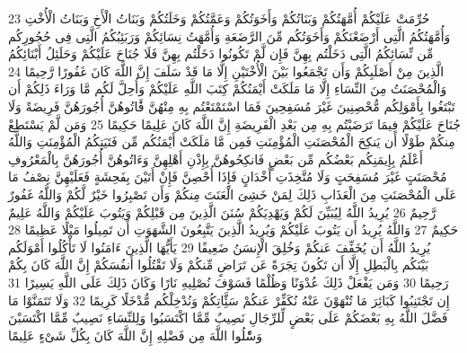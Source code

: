 \documentclass[20pt,a4paper]{article}
\begin{document}
{\tiny\colorbox{cl_aya}{23}} حُرِّمَتْ عَلَيْكُمْ أُمَّهَتُكُمْ وَبَنَاتُكُمْ وَأَخَوَتُكُمْ وَعَمَّتُكُمْ وَخَلَتُكُمْ وَبَنَاتُ الْأَخِ وَبَنَاتُ الْأُخْتِ وَأُمَّهَتُكُمُ الَّتِى أَرْضَعْنَكُمْ وَأَخَوَتُكُم مِّنَ الرَّضَعَةِ وَأُمَّهَتُ نِسَائِكُمْ وَرَبَئِبُكُمُ الَّتِى فِى حُجُورِكُم مِّن نِّسَائِكُمُ الَّتِى دَخَلْتُم بِهِنَّ فَإِن لَّمْ تَكُونُوا دَخَلْتُم بِهِنَّ فَلَا جُنَاحَ عَلَيْكُمْ وَحَلَئِلُ أَبْنَائِكُمُ الَّذِينَ مِنْ أَصْلَبِكُمْ وَأَن تَجْمَعُوا بَيْنَ الْأُخْتَيْنِ إِلَّا مَا قَدْ سَلَفَ إِنَّ اللَّهَ كَانَ غَفُورًا رَّحِيمًا
{\tiny\colorbox{cl_aya}{24}} وَالْمُحْصَنَتُ مِنَ النِّسَاءِ إِلَّا مَا مَلَكَتْ أَيْمَنُكُمْ كِتَبَ اللَّهِ عَلَيْكُمْ وَأُحِلَّ لَكُم مَّا وَرَاءَ ذَلِكُمْ أَن تَبْتَغُوا بِأَمْوَلِكُم مُّحْصِنِينَ غَيْرَ مُسَفِحِينَ فَمَا اسْتَمْتَعْتُم بِهِ مِنْهُنَّ فََٔاتُوهُنَّ أُجُورَهُنَّ فَرِيضَةً وَلَا جُنَاحَ عَلَيْكُمْ فِيمَا تَرَضَيْتُم بِهِ مِن بَعْدِ الْفَرِيضَةِ إِنَّ اللَّهَ كَانَ عَلِيمًا حَكِيمًا
{\tiny\colorbox{cl_aya}{25}} وَمَن لَّمْ يَسْتَطِعْ مِنكُمْ طَوْلًا أَن يَنكِحَ الْمُحْصَنَتِ الْمُؤْمِنَتِ فَمِن مَّا مَلَكَتْ أَيْمَنُكُم مِّن فَتَيَتِكُمُ الْمُؤْمِنَتِ وَاللَّهُ أَعْلَمُ بِإِيمَنِكُم بَعْضُكُم مِّن بَعْضٍ فَانكِحُوهُنَّ بِإِذْنِ أَهْلِهِنَّ وَءَاتُوهُنَّ أُجُورَهُنَّ بِالْمَعْرُوفِ مُحْصَنَتٍ غَيْرَ مُسَفِحَتٍ وَلَا مُتَّخِذَتِ أَخْدَانٍ فَإِذَا أُحْصِنَّ فَإِنْ أَتَيْنَ بِفَحِشَةٍ فَعَلَيْهِنَّ نِصْفُ مَا عَلَى الْمُحْصَنَتِ مِنَ الْعَذَابِ ذَلِكَ لِمَنْ خَشِىَ الْعَنَتَ مِنكُمْ وَأَن تَصْبِرُوا خَيْرٌ لَّكُمْ وَاللَّهُ غَفُورٌ رَّحِيمٌ
{\tiny\colorbox{cl_aya}{26}} يُرِيدُ اللَّهُ لِيُبَيِّنَ لَكُمْ وَيَهْدِيَكُمْ سُنَنَ الَّذِينَ مِن قَبْلِكُمْ وَيَتُوبَ عَلَيْكُمْ وَاللَّهُ عَلِيمٌ حَكِيمٌ
{\tiny\colorbox{cl_aya}{27}} وَاللَّهُ يُرِيدُ أَن يَتُوبَ عَلَيْكُمْ وَيُرِيدُ الَّذِينَ يَتَّبِعُونَ الشَّهَوَتِ أَن تَمِيلُوا مَيْلًا عَظِيمًا
{\tiny\colorbox{cl_aya}{28}} يُرِيدُ اللَّهُ أَن يُخَفِّفَ عَنكُمْ وَخُلِقَ الْإِنسَنُ ضَعِيفًا
{\tiny\colorbox{cl_aya}{29}} يَأَيُّهَا الَّذِينَ ءَامَنُوا لَا تَأْكُلُوا أَمْوَلَكُم بَيْنَكُم بِالْبَطِلِ إِلَّا أَن تَكُونَ تِجَرَةً عَن تَرَاضٍ مِّنكُمْ وَلَا تَقْتُلُوا أَنفُسَكُمْ إِنَّ اللَّهَ كَانَ بِكُمْ رَحِيمًا
{\tiny\colorbox{cl_aya}{30}} وَمَن يَفْعَلْ ذَلِكَ عُدْوَنًا وَظُلْمًا فَسَوْفَ نُصْلِيهِ نَارًا وَكَانَ ذَلِكَ عَلَى اللَّهِ يَسِيرًا
{\tiny\colorbox{cl_aya}{31}} إِن تَجْتَنِبُوا كَبَائِرَ مَا تُنْهَوْنَ عَنْهُ نُكَفِّرْ عَنكُمْ سَئَِّاتِكُمْ وَنُدْخِلْكُم مُّدْخَلًا كَرِيمًا
{\tiny\colorbox{cl_aya}{32}} وَلَا تَتَمَنَّوْا مَا فَضَّلَ اللَّهُ بِهِ بَعْضَكُمْ عَلَى بَعْضٍ لِّلرِّجَالِ نَصِيبٌ مِّمَّا اكْتَسَبُوا وَلِلنِّسَاءِ نَصِيبٌ مِّمَّا اكْتَسَبْنَ وَسَْٔلُوا اللَّهَ مِن فَضْلِهِ إِنَّ اللَّهَ كَانَ بِكُلِّ شَىْءٍ عَلِيمًا
\end{document}

